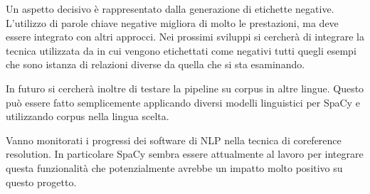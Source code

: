 Un aspetto decisivo è rappresentato dalla generazione di etichette negative. L'utilizzo di parole chiave negative migliora di molto le prestazioni, ma deve essere integrato con altri approcci. Nei prossimi sviluppi si cercherà di integrare la tecnica utilizzata da \citet{Mintz2009DistantSF} in cui vengono etichettati come negativi tutti quegli esempi che sono istanza di relazioni diverse da quella che si sta esaminando.

In futuro si cercherà inoltre di testare la pipeline su corpus in altre lingue. Questo può essere fatto semplicemente applicando diversi modelli linguistici per SpaCy e utilizzando corpus nella lingua scelta.

Vanno monitorati i progressi dei software di NLP nella tecnica di coreference resolution. In particolare SpaCy sembra essere attualmente al lavoro per integrare questa funzionalità \cite{spacy_coref} che potenzialmente avrebbe un impatto molto positivo su questo progetto.




